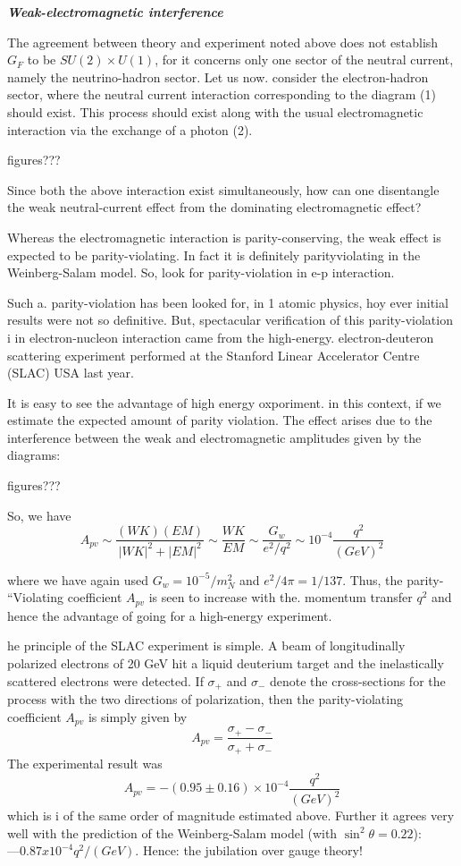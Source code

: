 \textbf{{\it Weak-electromagnetic interference}}

The agreement between theory and experiment noted above does not establish $G_{F}$ to be $SU(2) \times U(1)$, for it concerns only one sector of the neutral current, namely the neutrino-hadron sector. Let us now. consider
the electron-hadron sector, where the neutral current interaction corresponding to the diagram (1) should exist. This process should exist along
with the usual electromagnetic interaction via the exchange of a photon (2). 

figures???

Since both the above interaction exist simultaneously, how can one
disentangle the weak neutral-current effect from the dominating electromagnetic effect? 

Whereas the electromagnetic interaction is parity-conserving, the weak
effect is expected to be parity-violating. In fact it is definitely parityviolating in the Weinberg-Salam model. So, look for parity-violation in
e-p interaction. 

Such a. parity-violation has been looked for, in 1 atomic physics, hoy ever
initial results were not so definitive. But, spectacular verification of this
parity-violation i in electron-nucleon interaction came from the high-energy.
electron-deuteron scattering experiment performed at the Stanford Linear
Accelerator Centre (SLAC) USA last year. 

It is easy to see the advantage of high energy oxporiment. in this context, if we estimate the expected amount of parity violation. The effect arises due to the interference between the weak and electromagnetic 
amplitudes given by the diagrams: 

figures???

So, we have 
$$
A_{pv} \sim \frac{(W K)(EM)}{|WK|^{2} + |EM|^{2}} \sim \frac{WK}{EM} \sim \frac{G_{w}}{e^{2}/q^{2}} \sim 10^{-4} \frac{q^{2}}{(GeV)^{2}}
$$

where we have again used $G_{w} = 10^{-5}/m^{2}_{N}$ and $e
^{2}/4\pi = 1/137$. Thus, the
parity- “Violating coefficient $A_{pv}$ is seen to increase with the. momentum
transfer $q^{2}$ and hence the advantage of going for a high-energy experiment. 

he principle of the SLAC experiment is simple. A beam of longitudinally polarized electrons of 20 GeV hit a liquid deuterium target and
the inelastically scattered electrons were detected. If $\sigma_{+}$ and $\sigma_{-}$ denote the
cross-sections for the process with the two directions of polarization, then
the parity-violating coefficient $A_{pv}$ is simply given by 
$$
A_{pv}=\frac{\sigma_{+}-\sigma_{-}}{\sigma_{+}+ \sigma_{-}}
$$
The experimental result was 
$$
A_{pv}= -(0.95 \pm 0.16) \times 10^{-4} \frac{q^{2}}{(GeV)^{2}}
$$
which is i of the same order of magnitude estimated above. Further it
agrees very well with the prediction of the Weinberg-Salam model (with
$\sin^{2}\theta = 0.22$): $— 0.87 x 10^{-4} q^{2}/(GeV)$. Hence: the jubilation over
gauge theory! 

